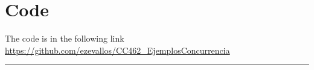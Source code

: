 \documentclass[10pt,a4paper]{article}
\theoremstyle{definition}
\begin{document}
\section{Code}
The code is in the following link \url{https://github.com/ezevallos/CC462_EjemplosConcurrencia}



\vspace{20pt}
\hrule
\vspace{10pt}

\nocite{*}
%



\end{document}

